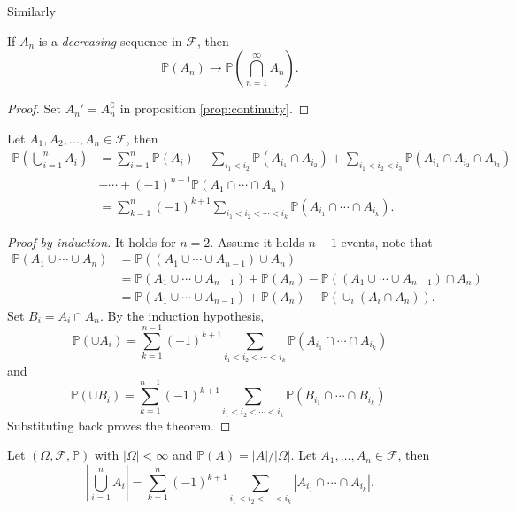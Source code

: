 Similarly 
\begin{corollary}\label{col:continuity2}
    If $ A_n $ is a \textit{decreasing} sequence in $ \mathcal{F} $, then 
    \[
        \mathbb{P}(A_n)\to \mathbb{P}\left( \bigcap_{n=1}^{\infty}A_n \right).
    \]
\end{corollary}
\begin{proof}
    Set $ A_n' = A_n^{\complement} $ in proposition \ref{prop:continuity}.
\end{proof}

\begin{proposition}\label{prop:Inclusion-exclusion formula}
    Let $ A_1,A_2, \dots, A_n\in \mathcal{F} $, then 
    \begin{align*}
        \mathbb{P}\left( \bigcup_{i=1}^{n}A_i \right) &= \sum_{i=1}^{n}\mathbb{P}(A_i) - \sum_{i_1<i_2} \mathbb{P}(A_{i_1}\cap A_{i_2})+\sum_{i_1<i_2<i_3}\mathbb{P}(A_{i_1}\cap A_{i_2}\cap A_{i_3})\\ 
        &-\cdots+ (-1)^{n+1} \mathbb{P}(A_1 \cap \cdots \cap A_n)\\ 
        &=\sum_{k=1}^{n}(-1)^{k+1} \sum_{i_1<i_2<\cdots<i_k}\mathbb{P}\left( A_{i_1}\cap \cdots \cap A_{i_k} \right).
    \end{align*}
\end{proposition}
\begin{proof}[Proof by induction]
    It holds for $n=2$. Assume it holds $n-1$ events, note that 
    \begin{align*}
        \mathbb{P}(A_1 \cup \cdots \cup A_n)&= \mathbb{P}\left( (A_1 \cup \cdots \cup A_{n-1}) \cup A_n \right)\\ 
        &= \mathbb{P}(A_1 \cup \cdots \cup A_{n-1})+\mathbb{P}(A_n)-\mathbb{P}((A_1 \cup \cdots \cup A_{n-1})\cap A_n)\\ 
        &= \mathbb{P}(A_1 \cup \cdots \cup A_{n-1})+\mathbb{P}(A_n)-\mathbb{P}(\cup_i (A_i\cap A_n)).
    \end{align*}
    Set $ B_i=A_i\cap A_n $. By the induction hypothesis,
    \[
        \mathbb{P}(\cup A_i)=\sum_{k=1}^{n-1}(-1)^{k+1} \sum_{i_1<i_2<\cdots<i_k}\mathbb{P}\left( A_{i_1}\cap \cdots \cap A_{i_k} \right)
    \]
    and 
    \[
        \mathbb{P}(\cup B_i)=\sum_{k=1}^{n-1}(-1)^{k+1} \sum_{i_1<i_2<\cdots<i_k}\mathbb{P}\left( B_{i_1}\cap \cdots \cap B_{i_k} \right).
    \]
    Substituting back proves the theorem.
\end{proof}
\begin{corollary}\label{col:inclusion-exclusion2}
        Let $ (\Omega,\mathcal{F},\mathbb{P}) $ with $ |\Omega|<\infty  $ and $ \mathbb{P}(A)=|A|/|\Omega| $. Let $ A_1,\dots,A_n\in \mathcal{F} $, then 
        \[
            \left| \bigcup_{i=1}^{n}A_i \right| = \sum_{k=1}^{n}(-1)^{k+1} \sum_{i_1<i_2<\cdots<i_k}\left| A_{i_1}\cap \cdots \cap A_{i_k} \right|.
        \]
\end{corollary}


